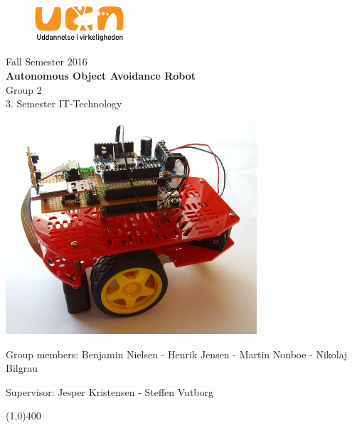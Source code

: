 \clearpage
\thispagestyle{empty}

\begin{figure}[H]
	\raggedleft
		\includegraphics[width=0.3\textwidth]{figures/logo-ucn.png}
\end{figure}
\vspace*{\fill} 
\begin{center}
\begin{Huge}
Fall Semester 2016\\
\vspace{5 mm}
\textbf{Autonomous Object Avoidance Robot}\\
\vspace{3 mm}
Group 2\\
\vspace{3 mm}
3. Semester IT-Technology
\end{Huge}
\includegraphics[width=0.7\textwidth]{figures/Forsidebil.PNG}
\end{center}
\vspace*{\fill}
\begin{center}
Group members:
 Benjamin Nielsen - Henrik Jensen - Martin Nonboe - Nikolaj Bilgrau
\end{center}
\begin{center}
Supervisor: Jesper Kristensen - Steffen Vutborg
\end{center}
\begin{center}
\line(1,0){400}
\end{center}